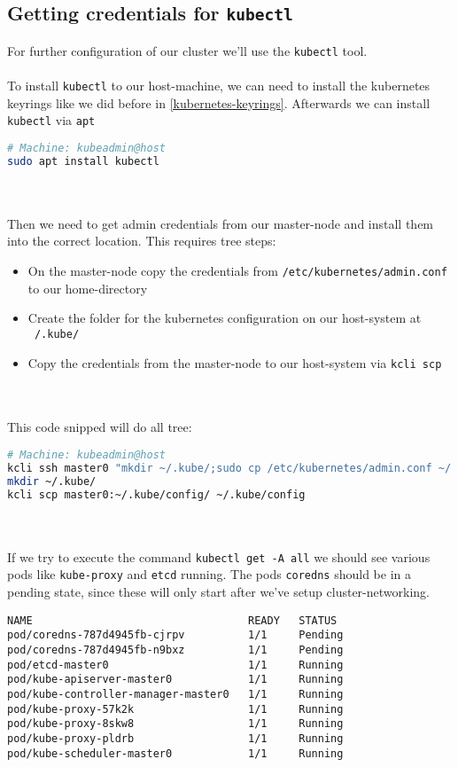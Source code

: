 \subsection{Getting credentials for \texttt{kubectl}}
For further configuration of our cluster we'll use the \texttt{kubectl} tool.\\\\
To install \texttt{kubectl} to our host-machine, we can need to install the kubernetes keyrings like we did before in \ref{kubernetes-keyrings}. Afterwards we can install \texttt{kubectl} via \texttt{apt}
\begin{lstlisting}[language=bash,caption=Install kubectl] 
# Machine: kubeadmin@host
sudo apt install kubectl
\end{lstlisting}
\\\\
Then we need to get admin credentials from our master-node and install them into the correct location. This requires tree steps:
\begin{itemize}
  \item On the master-node copy the credentials from \texttt{/etc/kubernetes/admin.conf} to our home-directory
  \item Create the folder for the kubernetes configuration on our host-system at \texttt{~/.kube/}
  \item Copy the credentials from the master-node to our host-system via \texttt{kcli scp}
\end{itemize}
\\\\
This code snipped will do all tree:
\begin{lstlisting}[language=bash, caption=Get admin credentials from master-node] 
# Machine: kubeadmin@host
kcli ssh master0 "mkdir ~/.kube/;sudo cp /etc/kubernetes/admin.conf ~/.kube/config"
mkdir ~/.kube/
kcli scp master0:~/.kube/config/ ~/.kube/config
\end{lstlisting}
\\\\
If we try to execute the command \texttt{kubectl get -A all} we should see various pods like \texttt{kube-proxy} and \texttt{etcd} running. The pods \texttt{coredns} should be in a pending state, since these will only start after we've setup cluster-networking.\\
\begin{lstlisting}[caption=Cluster state after bootstrapping master- and worker-nodes] 
NAME                                  READY   STATUS 
pod/coredns-787d4945fb-cjrpv          1/1     Pending
pod/coredns-787d4945fb-n9bxz          1/1     Pending
pod/etcd-master0                      1/1     Running
pod/kube-apiserver-master0            1/1     Running
pod/kube-controller-manager-master0   1/1     Running
pod/kube-proxy-57k2k                  1/1     Running
pod/kube-proxy-8skw8                  1/1     Running
pod/kube-proxy-pldrb                  1/1     Running
pod/kube-scheduler-master0            1/1     Running
\end{lstlisting}

